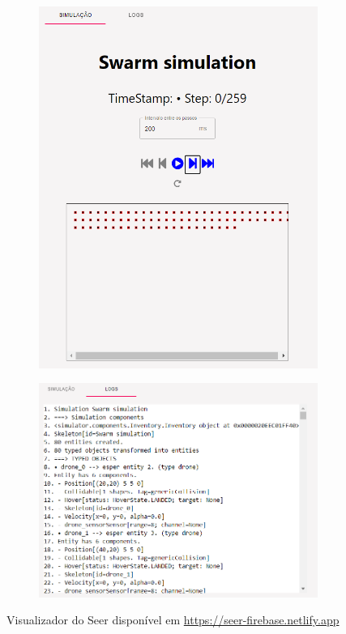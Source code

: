 \begin{figure}
    \centering
    \begin{subfigure}[b]{0.4\textwidth}
        \includegraphics[width=\textwidth]{img/seer_simulation.png}
    \end{subfigure}
    \hfill
    \begin{subfigure}[b]{0.5\textwidth}
        \includegraphics[width=\textwidth]{img/seer_logs.png}
    \end{subfigure}
    \caption{Visualizador do Seer disponível em \url{https://seer-firebase.netlify.app}}
    \label{fig:dullens_big_contribution}
\end{figure}

